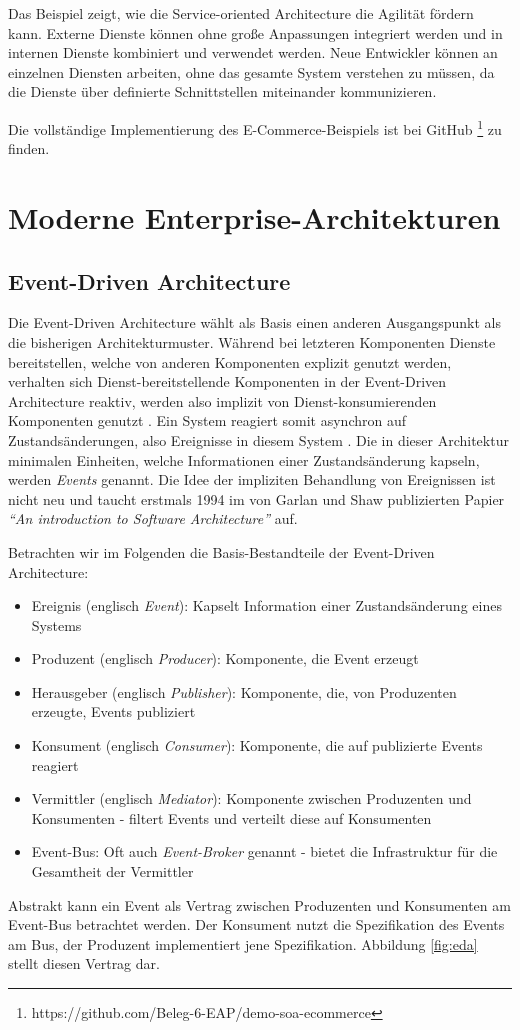 \documentclass[acmtog]{acmart}
\begin{document}
Das Beispiel zeigt, wie die Service-oriented Architecture die Agilität fördern kann.
Externe Dienste können ohne große Anpassungen integriert werden und in internen 
Dienste kombiniert und verwendet werden. Neue Entwickler können an einzelnen Diensten arbeiten, 
ohne das gesamte System verstehen zu müssen, da die Dienste über definierte 
Schnittstellen miteinander kommunizieren.


Die vollständige Implementierung des E-Commerce-Beispiels ist bei GitHub \footnote{https://github.com/Beleg-6-EAP/demo-soa-ecommerce} zu finden.



\section{Moderne Enterprise-Architekturen}

\subsection{Event-Driven Architecture}
Die Event-Driven Architecture wählt als Basis einen anderen Ausgangspunkt als die bisherigen Architekturmuster.
Während bei letzteren Komponenten Dienste bereitstellen, welche von anderen Komponenten explizit genutzt werden,
verhalten sich Dienst-bereitstellende Komponenten in der Event-Driven Architecture reaktiv,
werden also implizit von Dienst-konsumierenden Komponenten genutzt \cite{garlanShawImplizit}.
Ein System reagiert somit asynchron auf Zustandsänderungen, also Ereignisse in diesem System \cite{eda}.
Die in dieser Architektur minimalen Einheiten, welche Informationen einer Zustandsänderung kapseln, werden \textit{Events} genannt.
Die Idee der impliziten Behandlung von Ereignissen ist nicht neu und taucht erstmals 1994 im von Garlan und Shaw publizierten Papier
\textit{\enquote{An introduction to Software Architecture}} auf.

Betrachten wir im Folgenden die Basis-Bestandteile der Event-Driven Architecture:
\begin{itemize}
  \item Ereignis (englisch \textit{Event}): Kapselt Information einer Zustandsänderung eines Systems
  \item Produzent (englisch \textit{Producer}): Komponente, die Event erzeugt
  \item Herausgeber (englisch \textit{Publisher}): Komponente, die, von Produzenten erzeugte, Events publiziert
  \item Konsument (englisch \textit{Consumer}): Komponente, die auf publizierte Events reagiert
  \item Vermittler (englisch \textit{Mediator}): Komponente zwischen Produzenten und Konsumenten - filtert Events und verteilt diese auf Konsumenten
  \item Event-Bus: Oft auch \textit{Event-Broker} genannt - bietet die Infrastruktur für die Gesamtheit der Vermittler
\end{itemize}
Abstrakt kann ein Event als Vertrag zwischen Produzenten und Konsumenten am Event-Bus betrachtet werden.
Der Konsument nutzt die Spezifikation des Events am Bus, der Produzent implementiert jene Spezifikation.
Abbildung \ref{fig:eda} stellt diesen Vertrag dar.
\end{document}
